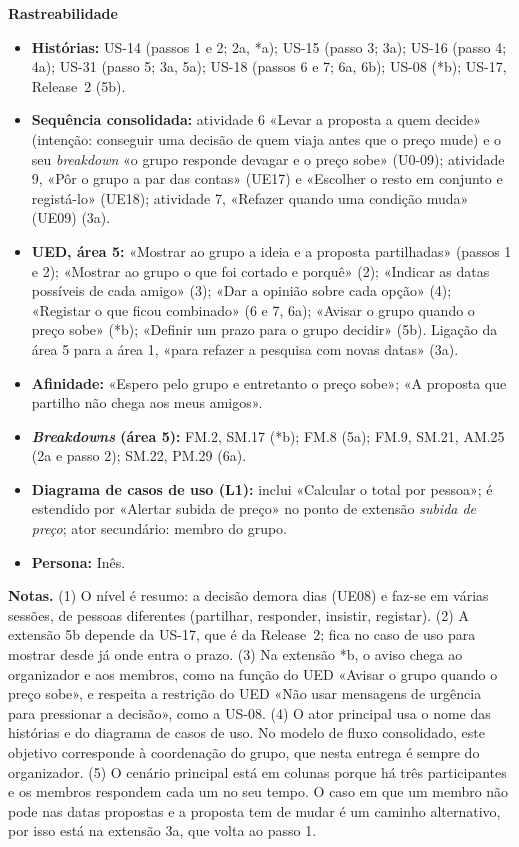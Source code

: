 \documentclass[11pt,a4paper]{article}
\newcommand{\reg}[1]{{\footnotesize\textcolor{pendente}{(#1)}}}
\newenvironment{usecase}[2]{%
  \par\medskip\noindent{\large\bfseries\color{roamly}#1: #2}\par\smallskip\small\noindent\ignorespaces}{\par\medskip}
\begin{document}
\begin{usecase}{UC-04}{Levar o grupo a decidir sobre a proposta}
\textbf{Rastreabilidade}
\begin{itemize}
  \item \textbf{Histórias:} US-14 (passos 1 e 2; 2a, *a); US-15 (passo 3; 3a); US-16 (passo 4; 4a); US-31 (passo 5; 3a, 5a); US-18 (passos 6 e 7; 6a, 6b); US-08 (*b); US-17, Release~2 (5b).
  \item \textbf{Sequência consolidada:} atividade 6 «Levar a proposta a quem decide» (intenção: conseguir uma decisão de quem viaja antes que o preço mude) e o seu \textit{breakdown} «o grupo responde devagar e o preço sobe» \reg{U0-09}; atividade 9, «Pôr o grupo a par das contas» \reg{UE17} e «Escolher o resto em conjunto e registá-lo» \reg{UE18}; atividade 7, «Refazer quando uma condição muda» \reg{UE09} (3a).
  \item \textbf{UED, área 5:} «Mostrar ao grupo a ideia e a proposta partilhadas» (passos 1 e 2); «Mostrar ao grupo o que foi cortado e porquê» (2); «Indicar as datas possíveis de cada amigo» (3); «Dar a opinião sobre cada opção» (4); «Registar o que ficou combinado» (6 e 7, 6a); «Avisar o grupo quando o preço sobe» (*b); «Definir um prazo para o grupo decidir» (5b). Ligação da área 5 para a área 1, «para refazer a pesquisa com novas datas» (3a).
  \item \textbf{Afinidade:} «Espero pelo grupo e entretanto o preço sobe»; «A proposta que partilho não chega aos meus amigos».
  \item \textbf{\textit{Breakdowns} (área 5):} FM.2, SM.17 (*b); FM.8 (5a); FM.9, SM.21, AM.25 (2a e passo 2); SM.22, PM.29 (6a).
  \item \textbf{Diagrama de casos de uso (L1):} inclui «Calcular o total por pessoa»; é estendido por «Alertar subida de preço» no ponto de extensão \textit{subida de preço}; ator secundário: membro do grupo.
  \item \textbf{Persona:} Inês.
\end{itemize}
\end{usecase}

\medskip
{\footnotesize\textbf{Notas.}
(1) O nível é resumo: a decisão demora dias \reg{UE08} e faz-se em várias sessões, de pessoas diferentes (partilhar, responder, insistir, registar).
(2) A extensão 5b depende da US-17, que é da Release~2; fica no caso de uso para mostrar desde já onde entra o prazo.
(3) Na extensão *b, o aviso chega ao organizador e aos membros, como na função do UED «Avisar o grupo quando o preço sobe», e respeita a restrição do UED «Não usar mensagens de urgência para pressionar a decisão», como a US-08.
(4) O ator principal usa o nome das histórias e do diagrama de casos de uso. No modelo de fluxo consolidado, este objetivo corresponde à coordenação do grupo, que nesta entrega é sempre do organizador.
(5) O cenário principal está em colunas porque há três participantes e os membros respondem cada um no seu tempo. O caso em que um membro não pode nas datas propostas e a proposta tem de mudar é um caminho alternativo, por isso está na extensão 3a, que volta ao passo 1.\par}
\end{document}
